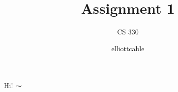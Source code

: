 \documentclass[
   paper=a4,
   fontsize=11pt,
   parskip=no
]{scrartcl}
\title{Assignment 1}
\subtitle{CS 330}
\author{elliottcable}
\begin{document}
   \maketitle

Hi! ⁓

   \blinddocument
\end{document}
